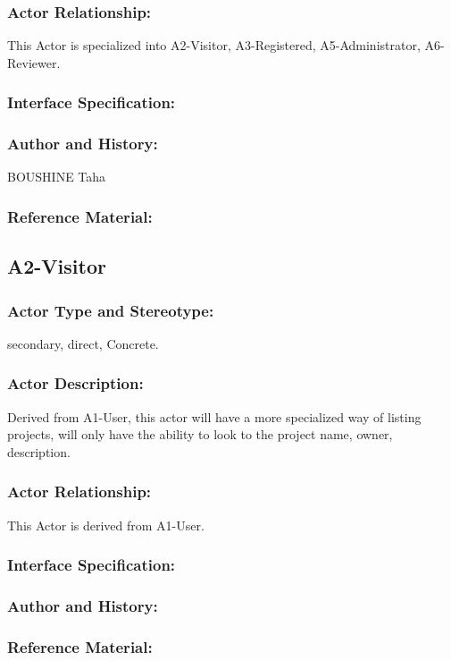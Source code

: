 \documentclass[11pt, openany]{report}
\begin{document}
\subsubsection{Actor Relationship:}
This Actor is specialized into A2-Visitor, A3-Registered, A5-Administrator, A6-Reviewer.

\subsubsection{Interface Specification:}
\subsubsection{Author and History:}
BOUSHINE Taha
\subsubsection{Reference Material:}
\clearpage


\subsection{A2-Visitor}
\label{A2}
\subsubsection{Actor Type and Stereotype:}
secondary, direct, Concrete.
\subsubsection{Actor Description:}
Derived from A1-User, this actor will have a more specialized way of listing projects, will only have the ability to look to the project name, owner, description.
\subsubsection{Actor Relationship:}
This Actor is derived from A1-User.
\subsubsection{Interface Specification:}
\subsubsection{Author and History:}
\subsubsection{Reference Material:}
\end{document}

